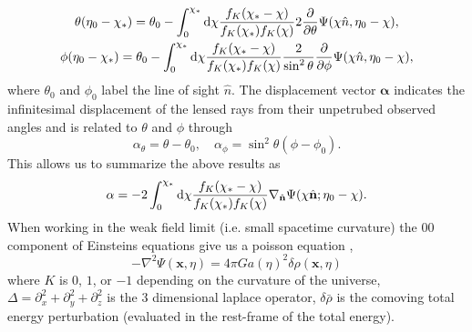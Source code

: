 \documentclass[11pt]{article} %
\DeclareRobustCommand{\d}{\ifmmode\text{d}\else d\fi}
\begin{document}
\begin{gather}
    \theta(\eta_0 - \chi_*)=\theta_0 - \int_0^{\chi_*}\d\chi\frac{f_K(\chi_* - \chi)}{f_K(\chi_*)f_K(\chi)}2\frac{\partial}{\partial \theta}\Psi(\chi\hat n, \eta_0 - \chi),\\
    \phi(\eta_0 - \chi_*)=\theta_0 - \int_0^{\chi_*}\d\chi\frac{f_K(\chi_* - \chi)}{f_K(\chi_*)f_K(\chi)}\frac{2}{\sin^2\theta}\frac{\partial}{\partial \phi}\Psi(\chi\hat n, \eta_0 - \chi),
\end{gather}
where $\theta_0$ and $\phi_0$ label the line of sight $\hat n$. The displacement vector $\mathbf{\alpha}$ indicates the infinitesimal displacement of the lensed rays from their unpetrubed observed angles and is related to $\theta$ and $\phi$ through
$$
\alpha_\theta = \theta - \theta_0, \quad \alpha_\phi = \sin^2\theta(\phi - \phi_0).
$$
This allows us to summarize the above results as
\begin{equation}
    \mathbf \alpha = -2 \int_0^{\chi_*}\d \chi \frac{f_K(\chi_* - \chi)}{f_K(\chi_*)f_K(\chi)}\nabla_{\hat{\mathbf n}}\Psi(\chi\hat{\mathbf n};\eta_0 - \chi).
\end{equation}
When working in the weak field limit (i.e. small spacetime curvature) the $00$ component of Einsteins equations give us a poisson equation \cite{dodelson_modern_cosmology},
\begin{equation}
    -\nabla^2\Psi(\textbf{x}, \eta) =  4\pi G a(\eta)^2\delta\rho(\mathbf x, \eta)
\end{equation}
where $K$ is $0$, $1$, or $-1$ depending on the curvature of the universe, $\Delta = \partial_x^2 + \partial_y^2 + \partial_z^2$ is the 3 dimensional laplace operator, $\delta\bar\rho$ is the comoving total energy perturbation (evaluated in the rest-frame of the total energy). %
\end{document}
